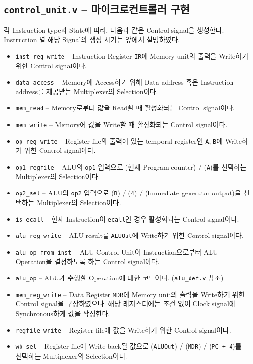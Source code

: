 \documentclass{scrartcl}
\begin{document}
\subsection{\texttt{control\_unit.v} -- 마이크로컨트롤러 구현}
각 Instruction type과 State에 따라, 다음과 같은 Control signal을 생성한다. Instruction 별 해당 Signal의 생성 시기는 앞에서 설명하였다.
\begin{itemize}
  \item \texttt{inst\_reg\_write} -- Instruction Register \texttt{IR}에 Memory unit의 출력을 Write하기 위한 Control signal이다.
  \item \texttt{data\_access} -- Memory에 Access하기 위해 Data address 혹은 Instruction address를 제공받는 Multiplexer의 Selection이다.
  \item \texttt{mem\_read} -- Memory로부터 값을 Read할 때 활성화되는 Control signal이다.
  \item \texttt{mem\_write} -- Memory에 값을 Write할 때 활성화되는 Control signal이다. 
  \item \texttt{op\_reg\_write} -- Register file의 출력에 있는 temporal register인 \texttt{A}, \texttt{B}에 Write하기 위한 Control signal이다.
  \item \texttt{op1\_regfile} -- ALU의 \texttt{op1} 입력으로 (현재 Program counter) / (\texttt{A})를 선택하는 Multiplexer의 Selection이다.
  \item \texttt{op2\_sel} -- ALU의 \texttt{op2} 입력으로 (\texttt{B}) / (\texttt{4}) / (Immediate generator output)을 선택하는 Multiplexer의 Selection이다.
  \item \texttt{is\_ecall} -- 현재 Instruction이 \texttt{ecall}인 경우 활성화되는 Control signal이다.
  \item \texttt{alu\_reg\_write} -- ALU result를 \texttt{ALUOut}에 Write하기 위한 Control signal이다.
  \item \texttt{alu\_op\_from\_inst} -- ALU Control Unit이 Instruction으로부터 ALU Operation을 결정하도록 하는 Control signal이다.
  \item \texttt{alu\_op} -- ALU가 수행할 Operation에 대한 코드이다. (\texttt{alu\_def.v} 참조)
  \item \texttt{mem\_reg\_write} -- Data Register \texttt{MDR}에 Memory unit의 출력을 Write하기 위한 Control signal을 구상하였으나, 해당 레지스터에는 조건 없이 Clock signal에 Synchronous하게 값을 작성한다.
  \item \texttt{regfile\_write} -- Register file에 값을 Write하기 위한 Control signal이다.
  \item \texttt{wb\_sel} -- Register file에 Write back될 값으로 (\texttt{ALUOut}) / (\texttt{MDR}) / (\texttt{PC + 4})를 선택하는 Multiplexer의 Selection이다.

\end{itemize}
\end{document}
